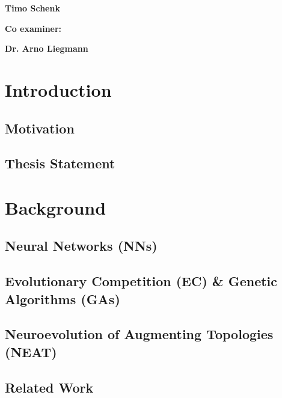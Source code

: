 \documentclass[11pt, a4paper, notitlepage]{report}
\begin{document}
\begin{titelpage}
{\begin{minipage}[t]{0.47\textwidth}
                \end{minipage}
                \hfill
                \begin{minipage}[t]{0.47\textwidth}\raggedleft
                \large \textbf {Timo Schenk}\\
                \end{minipage}
                \begin{minipage}[t]{0.47\textwidth}
                \large \textbf {Co examiner:}\\
                \end{minipage}
                \hfill
                \begin{minipage}[t]{0.47\textwidth}\raggedleft
                \large \textbf {Dr. Arno Liegmann}\\
                \end{minipage}
                \vfill
            }
        \clearpage
    \end{titelpage}
    \tableofcontents
    \chapter{Introduction}
        \section{Motivation}
        \section{Thesis Statement}
    \chapter{Background}
        \section{Neural Networks (NNs)}
        \section{Evolutionary Competition (EC) \& Genetic Algorithms (GAs)}
        \section{Neuroevolution of Augmenting Topologies (NEAT)}
        \section{Related Work}
\end{document}
